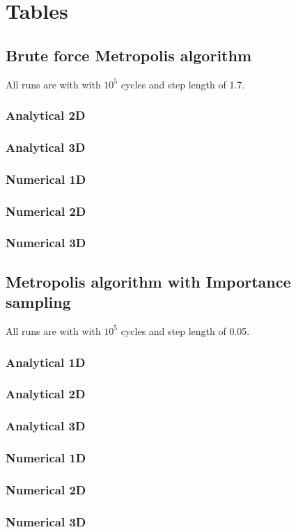 \section{Tables}
\subsection{Brute force Metropolis algorithm}
All runs are with with $10^5$ cycles and step length
of 1.7.
%
\subsubsection{Analytical 2D}

\subsubsection{Analytical 3D}

\newpage
\subsubsection{Numerical 1D}

\subsubsection{Numerical 2D}

\subsubsection{Numerical 3D}

\newpage
\subsection{Metropolis algorithm with Importance sampling}
All runs are with with $10^5$ cycles and step length
of 0.05.
\subsubsection{Analytical 1D}

\subsubsection{Analytical 2D}

\subsubsection{Analytical 3D}

\newpage
\subsubsection{Numerical 1D}

\subsubsection{Numerical 2D}

\subsubsection{Numerical 3D}

